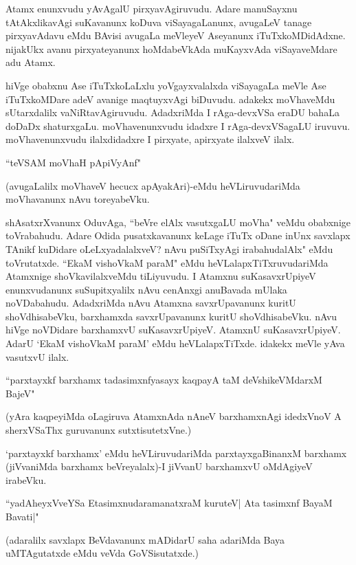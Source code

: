 Atamx enunxvudu yAvAgalU pirxyavAgiruvudu. Adare manuSayxnu tAtAkxlikavAgi suKavanunx koDuva viSayagaLanunx, avugaLeV tanage pirxyavAdavu eMdu BAvisi avugaLa meVleyeV Aseyanunx iTuTxkoMDidAdxne. nijakUkx avanu pirxyateyanunx hoMdabeVkAda muKayxvAda viSayaveMdare adu Atamx.

hiVge obabxnu Ase iTuTxkoLaLxlu yoVgayxvalalxda viSayagaLa meVle Ase iTuTxkoMDare adeV avanige maqtuyxvAgi biDuvudu. adakekx moVhaveMdu sUtarxdalilx vaNiRtavAgiruvudu. AdadxriMda I rAga-devxVSa eraDU bahaLa doDaDx shaturxgaLu. moVhavenunxvudu idadxre I rAga-devxVSagaLU iruvuvu. moVhavenunxvudu ilalxdidadxre I pirxyate, apirxyate ilalxveV ilalx.

\begin{shloka}
``teVSAM moVhaH pApiVyAnf"
\end{shloka}

(avugaLalilx moVhaveV hecucx apAyakAri)-eMdu heVLiruvudariMda moVhavanunx nAvu toreyabeVku.

shAsatxrXvanunx OduvAga, ``beVre elAlx vasutxgaLU moVha" veMdu obabxnige toVrabahudu. Adare Odida pusatxkavanunx keLage iTuTx oDane inUnx savxlapx TAnikf kuDidare oLeLxyadalalxveV? nAvu puSiTxyAgi irabahudalAlx" eMdu toVrutatxde. ``EkaM vishoVkaM paraM" eMdu heVLalapxTiTxruvudariMda Atamxnige shoVkavilalxveMdu tiLiyuvudu. I Atamxnu suKasavxrUpiyeV enunxvudanunx suSupitxyalilx nAvu cenAnxgi anuBavada mUlaka noVDabahudu. AdadxriMda nAvu Atamxna savxrUpavanunx kuritU shoVdhisabeVku, barxhamxda savxrUpavanunx kuritU shoVdhisabeVku. nAvu hiVge noVDidare barxhamxvU suKasavxrUpiyeV. AtamxnU suKasavxrUpiyeV. AdarU `EkaM vishoVkaM paraM' eMdu heVLalapxTiTxde. idakekx meVle yAva vasutxvU ilalx.

\begin{shloka}
``parxtayxkf barxhamx tadasimxnfyasayx kaqpayA taM deVshikeVMdarxM BajeV"
\end{shloka}

(yAra kaqpeyiMda oLagiruva AtamxnAda nAneV barxhamxnAgi idedxVnoV A sherxVSaThx guruvanunx sutxtisutetxVne.)

`parxtayxkf barxhamx' eMdu heVLiruvudariMda parxtayxgaBinanxM barxhamx (jiVvaniMda barxhamx beVreyalalx)-I jiVvanU barxhamxvU oMdAgiyeV irabeVku.

\begin{shloka}
``yadAheyxVveYSa EtasimxnudaramanatxraM kuruteV| Ata tasimxnf BayaM Bavati|"
\end{shloka}

(adaralilx savxlapx BeVdavanunx mADidarU saha adariMda Baya uMTAgutatxde eMdu veVda GoVSisutatxde.)

